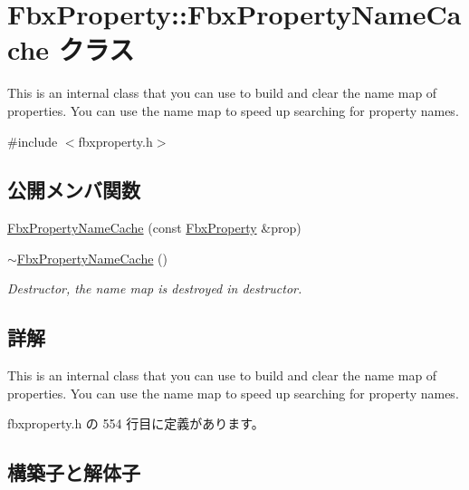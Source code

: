 \hypertarget{class_fbx_property_1_1_fbx_property_name_cache}{}\section{Fbx\+Property\+:\+:Fbx\+Property\+Name\+Cache クラス}
\label{class_fbx_property_1_1_fbx_property_name_cache}


This is an internal class that you can use to build and clear the name map of properties. You can use the name map to speed up searching for property names.  




{\ttfamily \#include $<$fbxproperty.\+h$>$}

\subsection*{公開メンバ関数}
\begin{DoxyCompactItemize}
\item 
\hyperlink{class_fbx_property_1_1_fbx_property_name_cache_a5bce2c1df640d45843d80fb2ad3e1ae0}{Fbx\+Property\+Name\+Cache} (const \hyperlink{class_fbx_property}{Fbx\+Property} \&prop)
\item 
\hyperlink{class_fbx_property_1_1_fbx_property_name_cache_a4750d4813c1a70064a44718946668f25}{$\sim$\+Fbx\+Property\+Name\+Cache} ()
\begin{DoxyCompactList}\small\item\em Destructor, the name map is destroyed in destructor. \end{DoxyCompactList}\end{DoxyCompactItemize}


\subsection{詳解}
This is an internal class that you can use to build and clear the name map of properties. You can use the name map to speed up searching for property names. 

 fbxproperty.\+h の 554 行目に定義があります。



\subsection{構築子と解体子}
\mbox{\label{class_fbx_property_1_1_fbx_property_name_cache_a5bce2c1df640d45843d80fb2ad3e1ae0}} 
